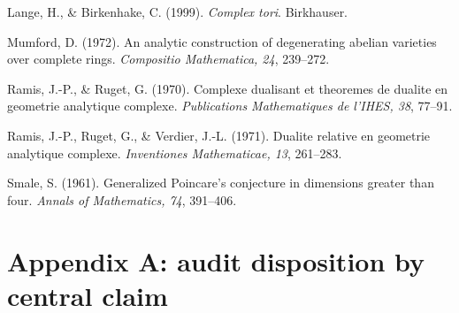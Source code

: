 \documentclass[
  10pt,
  letterpaper,
]{article}
\begin{document}
Lange, H., \& Birkenhake, C. (1999). \emph{Complex tori}. Birkhauser.

Mumford, D. (1972). An analytic construction of degenerating abelian
varieties over complete rings. \emph{Compositio Mathematica, 24},
239--272.

Ramis, J.-P., \& Ruget, G. (1970). Complexe dualisant et theoremes de
dualite en geometrie analytique complexe. \emph{Publications
Mathematiques de l'IHES, 38}, 77--91.

Ramis, J.-P., Ruget, G., \& Verdier, J.-L. (1971). Dualite relative en
geometrie analytique complexe. \emph{Inventiones Mathematicae, 13},
261--283.

Smale, S. (1961). Generalized Poincare's conjecture in dimensions
greater than four. \emph{Annals of Mathematics, 74}, 391--406.

\section{Appendix A: audit disposition by central
claim}\label{appendix-a-audit-disposition-by-central-claim}
\end{document}
